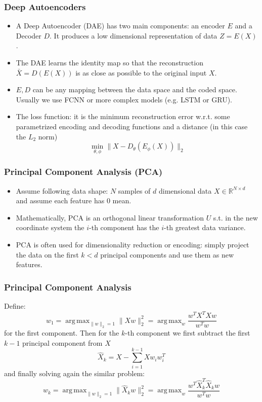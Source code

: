 \documentclass{beamer}
\theoremstyle{plain}
\theoremstyle{definition}
\theoremstyle{remark}
\newcommand{\R}{\mathbb{R}}
\newcommand{\norm}[1]{\lVert#1\rVert}
\DeclareMathOperator*{\argmax}{arg\,max}
\begin{document}
\begin{frame}
	\frametitle{Deep Autoencoders}
	\begin{itemize}
		\item A Deep Autoencoder (DAE) has two main components: an encoder $E$ and a Decoder $D$. It produces a low dimensional representation of data $Z=E(X)$.
		\item The DAE learns the identity map so that the reconstruction $\bar{X}=D(E(X))$ is as close as possible to the original input $X$.
		\item $E, D$ can be any mapping between the data space and the coded space. Usually we use FCNN or more complex models (e.g. LSTM or GRU).
		\item The loss function: it is the minimum reconstruction error w.r.t. some parametrized encoding and decoding functions and a distance (in this case the $L_2$ norm)
			\begin{equation}
				\min_{\theta, \phi}{\norm{X-D_{\theta}(E_{\phi}(X))}_{2}}
			\end{equation}
	\end{itemize}
\end{frame}

\begin{frame}
	\frametitle{Principal Component Analysis (PCA)}
	\begin{itemize}
		\item Assume following data shape: $N$ samples of $d$ dimensional data $X\in \R^{N\times d}$ and assume each feature has $0$ mean.
		\item Mathematically, PCA is an orthogonal linear transformation $U$ s.t. in the new coordinate system the $i$-th component has the $i$-th greatest data variance.
		\item PCA is often used for dimensionality reduction or encoding: simply project the data on the first $k<d$ principal components and use them as new features.
	\end{itemize}
\end{frame}

\begin{frame}
	\frametitle{Principal Component Analysis}
	Define:
	\begin{equation}
	    w_1 = \argmax_{\norm{w}_{2}=1}{\norm{Xw}_{2}^2} = \argmax_{w}{\frac{w^TX^TXw}{w^Tw}}
	\end{equation}
	for the first component. Then for the $k$-th component we first subtract the first $k-1$ principal component from $X$
	\begin{equation}
		\hat{X}_{k} = X - \sum_{i=1}^{k-1}{Xw_{i}w_{i}^T}
	\end{equation}
	and finally solving again the similar problem:
	\begin{equation}
		w_k = \argmax_{\norm{w}_{2}=1}{\norm{\hat{X}_{k}w}_{2}^2} = \argmax_{w}{\frac{w^T\hat{X}_{k}^T\hat{X}_{k}w}{w^Tw}}
	\end{equation}
\end{frame}
\end{document}
